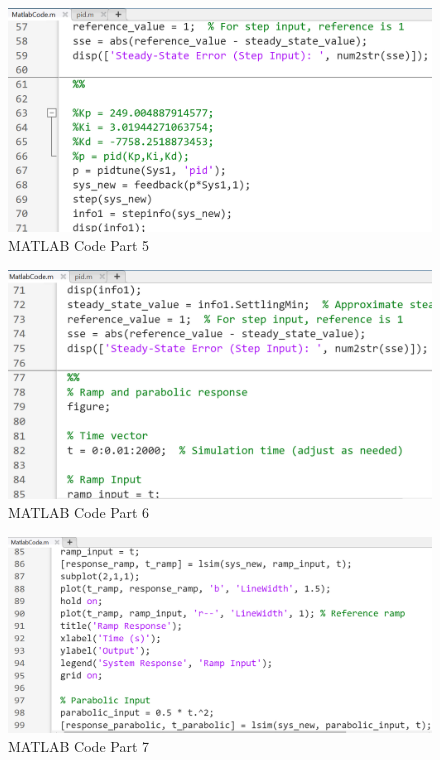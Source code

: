 \documentclass{article}
\begin{document}
\begin{figure}[h!]
	\centering
	\includegraphics[scale=0.75]{images/MatlabCode5.png}
	\caption{MATLAB Code Part 5}
	\label{fig:MatlabCode5}
\end{figure}

\begin{figure}[h!]
	\centering
	\includegraphics[scale=0.75]{images/MatlabCode6.png}
	\caption{MATLAB Code Part 6}
	\label{fig:MatlabCode4}
\end{figure}

\begin{figure}[h!]
	\centering
	\includegraphics[scale=0.65]{images/MatlabCode7.png}
	\caption{MATLAB Code Part 7}
	\label{fig:MatlabCode5}
\end{figure}
\end{document}
